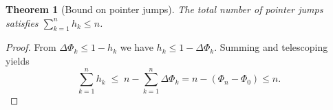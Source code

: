 \documentclass[11pt]{article}
\newtheorem{theorem}{Theorem}
\begin{document}
\begin{theorem}[Bound on pointer jumps]
The total number of pointer jumps satisfies $\sum_{k=1}^n h_k \le n$.
\end{theorem}

\begin{proof}
From $\Delta\Phi_k \le 1 - h_k$ we have $h_k \le 1 - \Delta\Phi_k$.
Summing and telescoping yields
\[
\sum_{k=1}^n h_k \;\le\; n - \sum_{k=1}^n \Delta\Phi_k
= n - (\Phi_n - \Phi_0) \le n.
\]
\end{proof}
\end{document}
